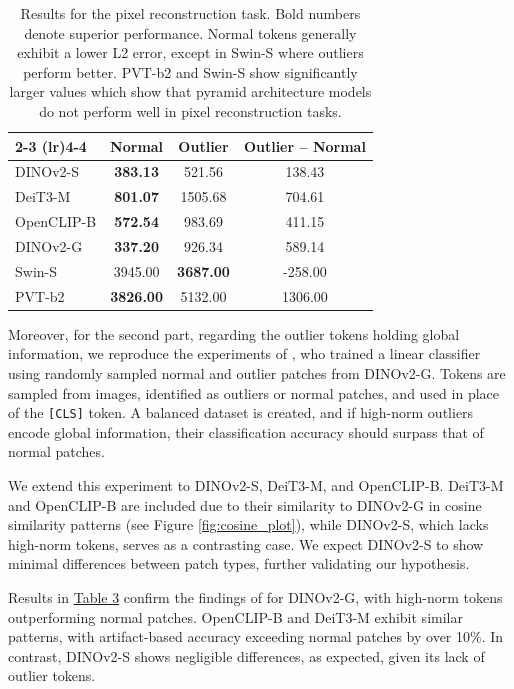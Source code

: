 \documentclass[10pt]{article} \usepackage[preprint]{tmlr}
\begin{document}
\begin{table}[htbp]
\begin{minipage}{0.48\linewidth}
{\begin{tabular}{l c c c}
    \cmidrule(lr){2-3} \cmidrule(lr){4-4}
     & \textbf{Normal} & \textbf{Outlier} & \textbf{Outlier – Normal} \\
    \midrule
    DINOv2-S   & \textbf{383.13} & 521.56  & 138.43 \\
    DeiT3-M    & \textbf{801.07} & 1505.68 & 704.61 \\
    OpenCLIP-B & \textbf{572.54} & 983.69  & 411.15 \\
    DINOv2-G   & \textbf{337.20} & 926.34  & 589.14 \\
    Swin-S     & 3945.00 & \textbf{3687.00} & -258.00 \\
    PVT-b2     & \textbf{3826.00} & 5132.00 & 1306.00 \\
    \bottomrule
    \end{tabular}}
    \caption{Results for the pixel reconstruction task. Bold numbers denote superior performance. Normal tokens generally exhibit a lower L2 error, except in Swin-S where outliers perform better. PVT-b2 and Swin-S show significantly larger values which show that pyramid architecture models do not perform well in pixel reconstruction tasks.}
    \label{tab:pixel_recon_results}
\end{minipage}
\end{table}

Moreover, for the second part, regarding the outlier tokens holding global information, we reproduce the experiments of \citet{darcet2024registers}, who trained a linear classifier using randomly sampled normal and outlier patches from DINOv2-G. Tokens are sampled from images, identified as outliers or normal patches, and used in place of the \texttt{[CLS]} token. A balanced dataset is created, and if high-norm outliers encode global information, their classification accuracy should surpass that of normal patches.

We extend this experiment to DINOv2-S, DeiT3-M, and OpenCLIP-B. DeiT3-M and OpenCLIP-B are included due to their similarity to DINOv2-G in cosine similarity patterns (see Figure \ref{fig:cosine_plot}), while DINOv2-S, which lacks high-norm tokens, serves as a contrasting case. We expect DINOv2-S to show minimal differences between patch types, further validating our hypothesis.

Results in \hyperref[tab:image_classification_results]{Table 3} confirm the findings of \citet{darcet2024registers} for DINOv2-G, with high-norm tokens outperforming normal patches. OpenCLIP-B and DeiT3-M exhibit similar patterns, with artifact-based accuracy exceeding normal patches by over 10\%. In contrast, DINOv2-S shows negligible differences, as expected, given its lack of outlier tokens.
\end{document}
